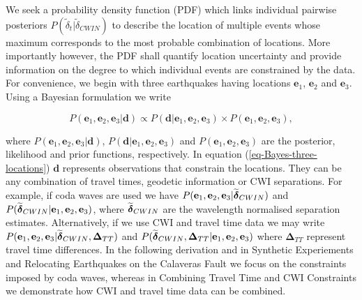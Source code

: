 \documentclass[12pt,double]{article}
\newcommand{\mitbf}[1]{  
  \hbox{\mathversion{bold}$#1$}}
\begin{document}
We seek a probability density function (PDF) which links
 individual pairwise posteriors $P(\widetilde{\delta}_t|\widetilde{\delta}_{CWIN})$
to describe the location of multiple events whose maximum corresponds to
 the most probable combination of locations.
More importantly however, the PDF shall
quantify location uncertainty and provide information
on the degree to which individual events are constrained
 by the data. For convenience, we begin with three earthquakes having locations
$\mathbf{e}_1$, $\mathbf{e}_2$ and $\mathbf{e}_3$. Using a Bayesian
formulation we write
\begin{linenomath*} \begin{equation}
\label{eq-Bayes-three-locations}
P(\mathbf{e}_1, \mathbf{e}_2, \mathbf{e}_3| \mathbf{d}) \propto P( \mathbf{d}|\mathbf{e}_1, \mathbf{e}_2, \mathbf{e}_3)
\times P(\mathbf{e}_1, \mathbf{e}_2, \mathbf{e}_3),
\end{equation} \end{linenomath*}
where $P(\mathbf{e}_1, \mathbf{e}_2, \mathbf{e}_3 | \mathbf{d})$,
$P(\mathbf{d}|\mathbf{e}_1, \mathbf{e}_2, \mathbf{e}_3)$ and
$P(\mathbf{e}_1, \mathbf{e}_2, \mathbf{e}_3)$ are the posterior,
likelihood and prior functions, respectively. In equation
(\ref{eq-Bayes-three-locations}) $\mathbf{d}$ represents
observations that constrain the locations. They can be any
combination of travel times, geodetic information  or CWI
separations. For example, if coda waves are used we have
$P(\mathbf{e}_1, \mathbf{e}_2, \mathbf{e}_3 |
\widetilde{\mitbf{\delta}}_{CWIN})$ and
$P(\widetilde{\mitbf{\delta}}_{CWIN}|\mathbf{e}_1, \mathbf{e}_2,
\mathbf{e}_3)$, where $\widetilde{\mitbf{\delta}}_{CWIN}$ are the
wavelength normalised separation estimates. Alternatively, if we use
CWI and travel time data we may write $P(\mathbf{e}_1, \mathbf{e}_2,
\mathbf{e}_3 | \widetilde{\mitbf{\delta}}_{CWIN},
\mathbf{\Delta}_{TT})$ and
$P(\widetilde{\mitbf{\delta}}_{CWIN},\mathbf{\Delta}_{TT}|\mathbf{e}_1,
\mathbf{e}_2, \mathbf{e}_3)$ where $\mathbf{\Delta}_{TT}$ represent
travel time differences. In the following derivation and in 
Synthetic Experiements and Relocating Earthquakes on the Calaveras Fault we focus
on the constraints imposed by coda waves, whereas in 
Combining Travel Time and CWI Constraints we demonstrate how CWI and travel
time data can be combined.
\end{document}

